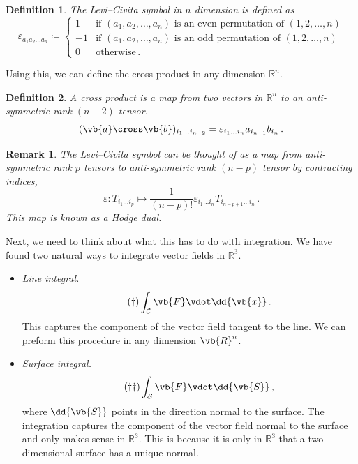 \documentclass{article}
\theoremstyle{plain}\theoremheaderfont{\normalfont\itshape}\theorembodyfont{\rmfamily}\theoremseparator{.}\newtheorem*{rem}{Remark}\newtheorem*{ex}{Example}\newtheorem*{proof}{Proof}\newtheorem*{altp}{Alternative proof}
\theoremstyle{plain}\theoremheaderfont{\normalfont\bfseries}\theorembodyfont{\rmfamily}\theoremseparator{.}\newtheorem{thm}{Theorem}[section]\newtheorem{lem}[thm]{Lemma}\newtheorem{prop}[thm]{Proposition}\newtheorem*{cor}{Corollary}\newtheorem{defn}[thm]{Definition}\newtheorem{clm}[thm]{Claim}\newtheorem{clminproof}{Claim}
\theoremstyle{break}\theoremheaderfont{\normalfont\itshape}\theorembodyfont{\rmfamily}\theoremseparator{.\medskip}\newtheorem*{proofskip}{Proof}\newtheorem*{exs}{Examples}\newtheorem*{rems}{Remarks}
\theoremstyle{break}\theoremheaderfont{\normalfont\bfseries}\theorembodyfont{\rmfamily}\theoremseparator{.\medskip}\newtheorem{lemskip}[thm]{Lemma}\newtheorem{defnskip}[thm]{Definition}\newtheorem{propskip}[thm]{Proposition}\newtheorem{thmskip}[thm]{Theorem}
\numberwithin{equation}{section}
\begin{document}
	\begin{defn}
		The \textit{Levi--Civita symbol} in \(n\) dimension is defined as
		\[\varepsilon_{a_1a_2\dots a_n}\coloneqq\begin{cases}
			1 & \text{if }(a_1,a_2,\dots,a_n)\text{ is an even permutation of }(1,2,\dots,n)\\
			-1 & \text{if }(a_1,a_2,\dots,a_n)\text{ is an odd permutation of }(1,2,\dots,n)\\
			0 & \text{otherwise}\,.
		\end{cases}\]
	\end{defn}
	Using this, we can define the cross product in any dimension \(\mathbb{R}^n\).
	\begin{defn}
		A \textit{cross product} is a map from two vectors in \(\mathbb{R}^n\) to an anti-symmetric rank \((n-2)\) tensor.
		\[(\vb{a}\cross\vb{b})_{i_1\dots i_{n-2}}=\varepsilon_{i_1\dots i_n}a_{i_{n-1}}b_{i_n}\,.\]
	\end{defn}
	\begin{rem}
		The Levi--Civita symbol can be thought of as a map from anti-symmetric rank \(p\) tensors to anti-symmetric rank \((n-p)\) tensor by contracting indices,
		\[\varepsilon:T_{i_1\dots i_p}\mapsto\frac{1}{(n-p)!}\varepsilon_{i_1\dots i_n}T_{i_{n-p+1}\dots i_n}\,.\]
		This map is known as a \textit{Hodge dual}.
	\end{rem}

	Next, we need to think about what this has to do with integration. We have found two natural ways to integrate vector fields in \(\mathbb{R}^3\).
	
	\begin{itemize}
		\item \textit{Line integral.}
		\begin{equation}\tag{\(\dagger\)}
			\int_{\mathcal{C}}\vb{F}\vdot\dd{\vb{x}}\,.
		\end{equation}
		This captures the component of the vector field tangent to the line. We can preform this procedure in any dimension \(\vb{R}^n\).
		\item \textit{Surface integral.}
		\begin{equation}\tag{\(\dagger\dagger\)}
			\int_{\mathcal{S}}\vb{F}\vdot\dd{\vb{S}}\,,
		\end{equation}
		where \(\dd{\vb{S}}\) points in the direction normal to the surface. The integration captures the component of the vector field normal to the surface and only makes sense in \(\mathbb{R}^3\). This is because it is only in \(\mathbb{R}^3\) that a two-dimensional surface has a unique normal.
	\end{itemize}
\end{document}
